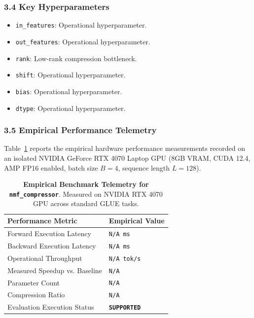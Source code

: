 \subsubsection*{3.4 Key Hyperparameters}
\begin{itemize}
    \item \texttt{in\_features}: Operational hyperparameter.
    \item \texttt{out\_features}: Operational hyperparameter.
    \item \texttt{rank}: Low-rank compression bottleneck.
    \item \texttt{shift}: Operational hyperparameter.
    \item \texttt{bias}: Operational hyperparameter.
    \item \texttt{dtype}: Operational hyperparameter.
\end{itemize}

\subsubsection*{3.5 Empirical Performance Telemetry}
Table~\ref{tab:telemetry_nmf\_compressor} reports the empirical hardware performance measurements recorded on an isolated NVIDIA GeForce RTX 4070 Laptop GPU (8GB VRAM, CUDA 12.4, AMP FP16 enabled, batch size $B=4$, sequence length $L=128$).

\begin{table}[h]
\centering
\small
\caption{\textbf{Empirical Benchmark Telemetry for \texttt{nmf\_compressor}}. Measured on NVIDIA RTX 4070 GPU across standard GLUE tasks.}
\label{tab:telemetry_nmf\_compressor}
\begin{tabularx}{\columnwidth}{lX}
\toprule
\textbf{Performance Metric} & \textbf{Empirical Value} \\
\midrule
Forward Execution Latency & \texttt{N/A ms} \\
Backward Execution Latency & \texttt{N/A ms} \\
Operational Throughput & \texttt{N/A tok/s} \\
Measured Speedup vs. Baseline & \texttt{N/A} \\
Parameter Count & \texttt{N/A} \\
Compression Ratio & \texttt{N/A} \\
Evaluation Execution Status & \textbf{\texttt{SUPPORTED}} \\
\bottomrule
\end{tabularx}
\end{table}

